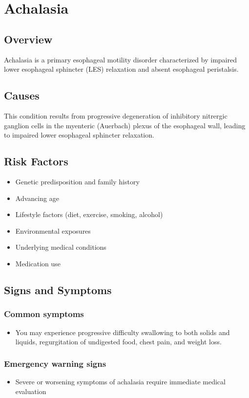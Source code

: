 \chapter{Achalasia}
\label{sec:Achalasia}

\section{Overview}
Achalasia is a primary esophageal motility disorder characterized by impaired lower esophageal sphincter (LES) relaxation and absent esophageal peristalsis.
\section{Causes}
This condition results from progressive degeneration of inhibitory nitrergic ganglion cells in the myenteric (Auerbach) plexus of the esophageal wall, leading to impaired lower esophageal sphincter relaxation.
\section{Risk Factors}

\begin{itemize}[noitemsep]
  \item Genetic predisposition and family history
  \item Advancing age
  \item Lifestyle factors (diet, exercise, smoking, alcohol)
  \item Environmental exposures
  \item Underlying medical conditions
  \item Medication use
\end{itemize}
\section{Signs and Symptoms}

\subsection{Common symptoms}
\begin{itemize}[noitemsep]
  \item You may experience progressive difficulty swallowing to both solids and liquids, regurgitation of undigested food, chest pain, and weight loss. 
  \end{itemize}

\subsection{Emergency warning signs}
\begin{itemize}[noitemsep]
  \item Severe or worsening symptoms of achalasia require immediate medical evaluation
\end{itemize}
